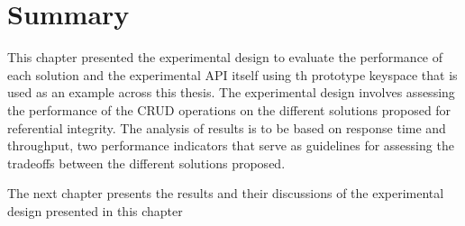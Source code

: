 \section{Summary} \label{sexp:Summary} 

This chapter  presented the experimental design to evaluate the performance of
each  solution and the experimental \ac{API} itself using th prototype keyspace
that is used as an example across this thesis. The experimental design involves
assessing the performance of the CRUD operations on the different solutions
proposed for referential integrity.
The analysis of results is to be based on response time and throughput, two
performance indicators that serve as guidelines for assessing the tradeoffs
between the different solutions proposed.
	
	
The next chapter presents the results and their discussions of the experimental
design presented in this chapter
 






